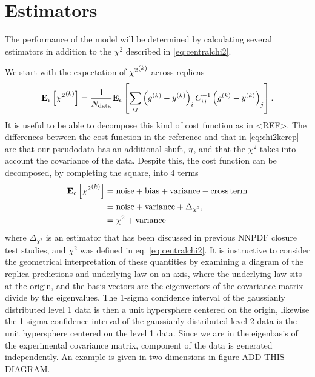 \section{Estimators}

The performance of the model will be determined by calculating several estimators
in addition to the $\chi^2$ described in \eqref{eq:centralchi2}.

We start with the expectation of ${\chi^2}^{(k)}$ across replicas
\begin{equation}
    \label{eq:chi2kerep}
    \mathbf{E}_{\epsilon}\left[ {\chi^2}^{(k)} \right] = \frac{1}{N_{\rm data}} 
    \mathbf{E}_{\epsilon}\left[  \sum_{ij} \left( g^{(k)} - y^{(k)} \right)_i C^{-1}_{ij} \left( g^{(k)} - y^{(k)} \right)_j \right].
\end{equation}
It is useful to be able to decompose this kind of cost function as in <REF>.
The differences between the cost function in the reference and that in \eqref{eq:chi2kerep}
are that our pseudodata has an additional shuft, $\eta$, and that the
$\chi^2$ takes into account the covariance of the data. Despite this, the cost
function can be decomposed, by completing the square, into 4 terms
\begin{equation}
    \label{eq:chi2decomp}
    \begin{split}
        \mathbf{E}_{\epsilon}\left[ {\chi^2}^{(k)} \right] &= {\rm noise} + {\rm bias} + {\rm variance} - {\rm cross\,term} \\
        &=  {\rm noise} + {\rm variance} + \Delta_{\chi^2}, \\
        &= \chi^2 + {\rm variance}
    \end{split}
\end{equation}
where $\Delta_{\chi^2}$ is an estimator that has been discussed in previous
NNPDF closure test studies, and $\chi^2$ was defined in eq. \eqref{eq:centralchi2}.
It is instructive to
consider the geometrical interpretation of these quantities by examining a
diagram of the replica predictions and underlying law on an axis, where
the underlying law sits at the origin, and the basis vectors are the eigenvectors
of the covariance matrix divide by the eigenvalues. The 1-sigma confidence interval
of the gaussianly distributed level 1 data is then a unit hypersphere centered
on the origin, likewise the 1-sigma confidence interval of the gaussianly
distributed level 2 data is the unit hypersphere centered on the level 1 data.
Since we are in the eigenbasis of the experimental covariance matrix,
component of the data is generated independently. An example is given in
two dimensions in figure ADD THIS DIAGRAM.

